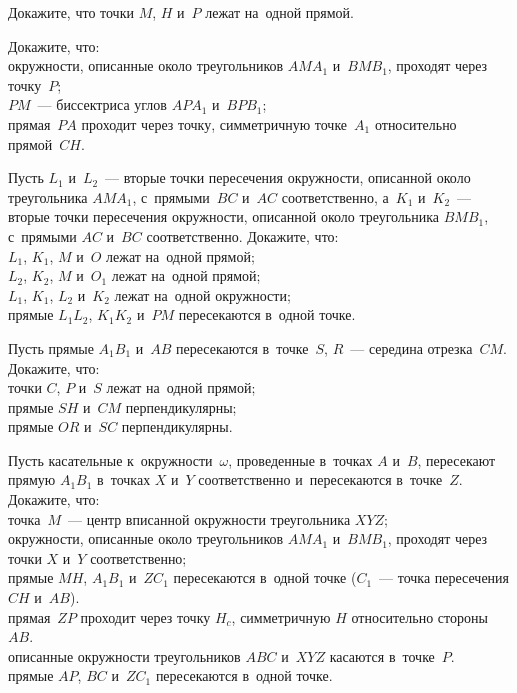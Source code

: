 \begin{problems}

\item
Докажите, что точки $M$, $H$ и~$P$ лежат на~одной прямой.

\item
Докажите, что:
\\
\subproblem
окружности, описанные около треугольников $AMA_{1}$ и~$BMB_{1}$, проходят через
точку~$P$;
\\
\subproblem
$PM$~--- биссектриса углов $APA_{1}$ и~$BPB_{1}$;
\\
\subproblem
прямая~$PA$ проходит через точку, симметричную точке~$A_{1}$ относительно
прямой~$CH$.

\item
Пусть $L_{1}$ и~$L_{2}$~--- вторые точки пересечения окружности, описанной
около треугольника $AMA_{1}$, с~прямыми~$BC$ и~$AC$ соответственно,
а~$K_{1}$ и~$K_{2}$~--- вторые точки пересечения окружности, описанной около
треугольника $BMB_{1}$, с~прямыми $AC$ и~$BC$ соответственно.
Докажите, что:
\\
\subproblem $L_{1}$, $K_{1}$, $M$ и~$O$ лежат на~одной прямой;
\\
\subproblem $L_{2}$, $K_{2}$, $M$ и~$O_{1}$ лежат на~одной прямой;
\\
\subproblem $L_{1}$, $K_{1}$, $L_{2}$ и~$K_{2}$ лежат на~одной окружности;
\\
\subproblem прямые $L_{1} L_{2}$, $K_{1} K_{2}$ и~$PM$ пересекаются в~одной точке.

\item
Пусть прямые $A_{1}B_{1}$ и~$AB$ пересекаются в~точке~$S$, $R$~--- середина
отрезка~$CM$.
Докажите, что:
\\
\subproblem точки $C$, $P$ и~$S$ лежат на~одной прямой;
\\
\subproblem прямые $SH$ и~$CM$ перпендикулярны;
\\
\subproblem прямые $OR$ и~$SC$ перпендикулярны.

\item
Пусть касательные к~окружности~$\omega$, проведенные в~точках $A$ и~$B$,
пересекают прямую $A_{1}B_{1}$ в~точках $X$ и~$Y$ соответственно и~пересекаются
в~точке~$Z$.
Докажите, что:
\\
\subproblem
точка~$M$~--- центр вписанной окружности треугольника $XYZ$;
\\
\subproblem
окружности, описанные около треугольников $AMA_{1}$ и~$BMB_{1}$, проходят через
точки $X$ и~$Y$ соответственно;
\\
\subproblem
прямые $MH$, $A_{1}B_{1}$ и~$ZC_{1}$ пересекаются в~одной точке
($C_{1}$~--- точка пересечения $CH$ и~$AB$).
\\
\subproblem
прямая~$ZP$ проходит через точку $H_{c}$, симметричную $H$ относительно
стороны~$AB$.
\\
\subproblem
описанные окружности треугольников $ABC$ и~$XYZ$ касаются в~точке~$P$.
\\
\subproblem
прямые $AP$, $BC$ и~$ZC_{1}$ пересекаются в~одной точке.

\end{problems}

